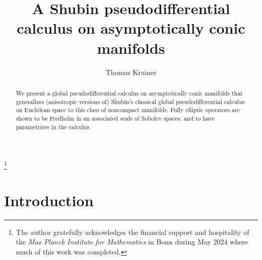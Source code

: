 \documentclass[reqno]{amsart}
\numberwithin{equation}{section}
\theoremstyle{definition}
\begin{document}
\title[Shubin calculus on asymptotically conic manifolds]{A Shubin pseudodifferential calculus on asymptotically conic manifolds}

\author{Thomas Krainer}
\address{Penn State Altoona\\ 3000 Ivyside Park \\ Altoona, PA 16601-3760}
\thanks{The author gratefully acknowledges the financial support and hospitality of the \emph{Max Planck Institute for Mathematics} in Bonn during May 2024 where much of this work was completed.}

\begin{abstract}
We present a global pseudodifferential calculus on asymptotically conic manifolds that generalizes (anisotropic versions of) Shubin's classical global pseudodifferential calculus on Euclidean space to this class of noncompact manifolds. Fully elliptic operators are shown to be Fredholm in an associated scale of Sobolev spaces, and to have parametrices in the calculus.
\end{abstract}


\maketitle


\section{Introduction}
\end{document}
